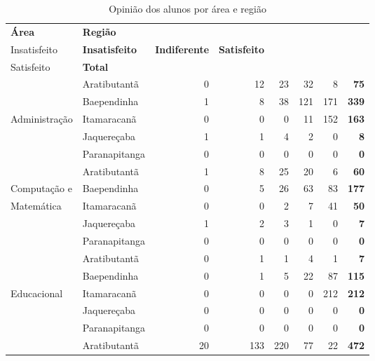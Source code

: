 \begin{table}[!h]
\scriptsize
\centering
\caption{Opinião dos alunos por área e região}
\vspace{0.5em}
\label{tabela:q15a}
\begin{tabular}{llrrrrrr}
\toprule
\textbf{Área} & \textbf{Região} &  \textbf{\specialcell{c}{Muito\\Insatisfeito}} &  \textbf{Insatisfeito} &  \textbf{ Indiferente} &  \textbf{ Satisfeito} & \textbf{\specialcell{c}{Muito\\Satisfeito}} & \textbf{Total} \\
   \midrule
					& Aratibutantã  &   0 &  12 &  23 &  32 &   8 & \textbf{75}\\ 
                    & Baependinha   &   1 &   8 &  38 & 121 & 171 & \textbf{339}\\ 
   Administração    & Itamaracanã   &   0 &   0 &   0 &  11 & 152 & \textbf{163}\\ 
                    & Jaquereçaba   &   1 &   1 &   4 &   2 &   0 & \textbf{8}\\ 
                    & Paranapitanga &   0 &   0 &   0 &   0 &   0 & \textbf{0}\\ 
\midrule
					& Aratibutantã  &   1 &   8 &  25 &  20 &   6 & \textbf{60}\\ 
	Computação e    & Baependinha   &   0 &   5 &  26 &  63 &  83 & \textbf{177}\\ 
	Matemática  	& Itamaracanã   &   0 &   0 &   2 &   7 &  41 & \textbf{50}\\ 
					& Jaquereçaba   &   1 &   2 &   3 &   1 &   0 & \textbf{7}\\ 
                    & Paranapitanga	&   0 &   0 &   0 &   0 &   0 & \textbf{0}\\ 
\midrule
					& Aratibutantã  &   0 &   1 &   1 &   4 &   1 & \textbf{7}\\ 
                    & Baependinha   &   0 &   1 &   5 &  22 &  87 & \textbf{115}\\ 
  Educacional       & Itamaracanã   &   0 &   0 &   0 &   0 & 212 & \textbf{212}\\ 
                    & Jaquereçaba   &   0 &   0 &   0 &   0 &   0 & \textbf{0}\\ 
                    & Paranapitanga &   0 &   0 &   0 &   0 &   0 & \textbf{0}\\ 
\midrule			
					& Aratibutantã  &  20 & 133 & 220 &  77 &  22 & \textbf{472}\\ 

\end{tabular}
\end{table}

